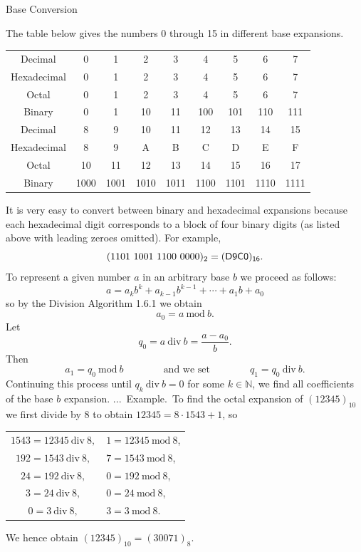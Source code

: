 \documentclass[smaller,hyperref={CJKbookmarks=true}]{beamer}
\newcommand{\N}{\mathbb{N}} \newcommand{\Z}{\mathbb{Z}} \newcommand{\Q}{\mathbb{Q}}
\newcounter{zhuo}[subsection]
\renewcommand{\thezhuo}{\thesection.\thesubsection.\arabic{zhuo}}
\newenvironment{EXAMPLE}{\stepcounter{zhuo}\alert{\!\thezhuo.~Example.\,}}{}
\begin{document}
\begin{frame}{Base Conversion}
\begin{spacing}{1.05}
The table below gives the numbers 0 through 15 in different base expansions.
\begin{center}
\begin{tabular}{ccccccccc}
\toprule
  Decimal & 0 & 1 & 2 & 3 & 4 & 5 & 6 & 7\\
  Hexadecimal & 0 & 1 & 2 & 3 & 4 & 5 & 6& 7 \\
  Octal & 0 & 1 & 2 & 3 & 4 & 5 & 6 & 7 \\
  Binary & 0 & 1 & 10 & 11 & 100 & 101 & 110 & 111 \\ \midrule
  Decimal & 8 & 9 & 10 & 11 & 12 & 13 & 14& 15 \\
  Hexadecimal & 8 & 9 & A & B & C & D & E& F \\
  Octal & 10 & 11 & 12 & 13 & 14 & 15 & 16& 17 \\
  Binary & 1000 & 1001 & 1010 & 1011 & 1100 & 1101 & 1110 & 1111 \\
  \bottomrule
\end{tabular}
\end{center}
It is very easy to convert between binary and hexadecimal expansions
because each hexadecimal digit corresponds to a block of four binary digits
(as listed above with leading zeroes omitted). For example,
\[(1101~1001~1100~0000)_2=(\sf{D9C0})_{16}.\]
\newpage
To represent a given number $a$ in an arbitrary base $b$ we proceed as follows:
\[a=a_kb^k+a_{k-1}b^{k-1}+\cdots+a_1b+a_0\]
so by the Division Algorithm 1.6.1 we obtain
\[a_0=a\:\text{mod}\:b.\]
Let
\[q_0=a\:\text{div}\:b=\frac{a-a_0}{b}.\]
Then
\[a_1=q_0\:\text{mod}\:b\qquad\qquad
\text{and we set}\qquad\qquad
q_1=q_0\:\text{div}\:b.\]
Continuing this process until $q_k\:\text{div}\:b=0$ for some $k\in\N$, we find all coefficients of the base $b$ expansion.
\newpage
\vspace*{9pt}
\begin{EXAMPLE}
To find the octal expansion of $(12345)_{10}$ we first divide by 8 to obtain $12345=8\cdot1543+1$, so\\[6pt]
\begin{center}
\begin{tabular}{cl}
  $1543=12345~\text{div}~8,$ & $1=12345~\text{mod}~8$, \\[3pt]
  $192=1543~\text{div}~8,$ & $7=1543~\text{mod}~8$, \\[3pt]
  $24=192~\text{div}~8,$ & $0=192~\text{mod}~8$, \\[3pt]
  $3=24~\text{div}~8,$ & $0=24~\text{mod}~8$, \\[3pt]
  \!\!$0=3~\text{div}~8,$ & $3=3~\text{mod}~8$. \\[3pt]
\end{tabular}
\end{center}
We hence obtain $(12345)_{10}=(30071)_8$.
\end{EXAMPLE}
\end{spacing}
\end{frame}
\end{document}

